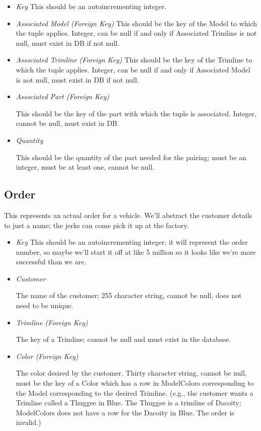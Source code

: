 \documentclass[11pt,letterpaper,oneside]{amsart}
\begin{document}
\begin{itemize}

\item \emph{Key}
	This should be an autoincrementing integer.
	
\item \emph{Associated Model (Foreign Key)}
	This should be the key of the Model to which the tuple applies.  Integer, can be null if and only if Associated Trimline is not null, must exist in DB if not null.
	
\item \emph{Associated Trimline (Foreign Key)}
	This should be the key of the Trimline to which the tuple applies.  Integer, can be null if and only if Associated Model is not null, must exist in DB if not null.
	
\item \emph{Associated Part (Foreign Key)}

	This should be the key of the part with which the tuple is associated.  Integer, cannot be null, must exist in DB.
	
\item \emph{Quantity}

	This should be the quantity of the part needed for the pairing; must be an integer, must be at least one, cannot be null.

	
\end{itemize}

\subsection*{Order}

This represents an actual order for a vehicle.  We'll abstract the customer details to just a name; the jerks can come pick it up at the factory.

\begin{itemize}

\item \emph{Key}
	This should be an autoincrementing integer; it will represent the order number, so maybe we'll start it off at like 5 million so it looks like we're more successful than we are.

\item \emph{Customer}

	The name of the customer; 255 character string, cannot be null, does not need to be unique.
	
\item \emph{Trimline (Foreign Key)}
	
	The key of a Trimline; cannot be null and must exist in the database.
	
\item \emph{Color (Foreign Key)}

	The color desired by the customer.  Thirty character string, cannot be null, must be the key of a Color which has a row in ModelColors corresponding to the Model corresponding to the desired Trimline.  (e.g., the customer wants a Trimline called a Thuggee in Blue.  The Thuggee is a trimline of Dacoity; ModelColors does not have a row for the Dacoity in Blue.  The order is invalid.)
	
\end{itemize}
\end{document}
